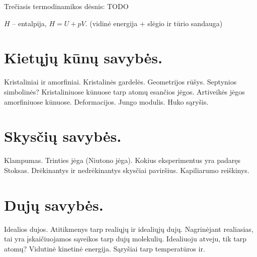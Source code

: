 Trečiasis termodinamikos dėsnis: TODO

$H$ – entalpija, $H = U + pV$. (vidinė energija + slėgio ir tūrio sandauga)

\section{Kietųjų kūnų savybės.}
Kristaliniai ir amorfiniai. Kristalinės gardelės. Geometrijos rūšys.
Septynios simbolinės? Kristaliniuose kūnuose tarp atomų esančios jėgos.
Artiveikės jėgos amorfiniuose kūnuose. Deformacijos. Jungo modulis.
Huko sąryšis.
\section{Skysčių savybės.}
Klampumas. Trinties jėga (Niutono jėga). Kokius eksperimentus yra padaręs
Stoksas. Drėkinantys ir nedrėkinantys skysčiai paviršius. Kapiliarumo
reiškinys.
\section{Dujų savybės.}
Idealios dujos. Atitikmenys tarp realiųjų ir idealiųjų dujų. Nagrinėjant
realiasias, tai yra įskaičiuojamos sąveikos tarp dujų molekulių. Idealiuoju
atveju, tik tarp atomų? Vidutinė kinetinė energija. Sąryšiai tarp
temperatūros ir.
